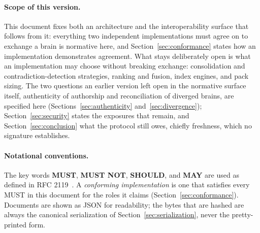 \documentclass[11pt,a4paper]{article}
\begin{document}
\paragraph{Scope of this version.}
This document fixes both an architecture and the interoperability surface that
follows from it: everything two independent implementations must agree on to
exchange a brain is normative here, and Section~\ref{sec:conformance} states
how an implementation demonstrates agreement. What stays deliberately open is what an implementation may choose
without breaking exchange: consolidation and contradiction-detection
strategies, ranking and fusion, index engines, and pack sizing. The two
questions an earlier version left open in the normative surface itself,
authenticity of authorship and reconciliation of diverged brains, are specified
here (Sections~\ref{sec:authenticity} and~\ref{sec:divergence});
Section~\ref{sec:security} states the exposures that remain, and
Section~\ref{sec:conclusion} what the protocol still owes, chiefly freshness,
which no signature establishes.

\paragraph{Notational conventions.}
The key words \textbf{MUST}, \textbf{MUST NOT}, \textbf{SHOULD}, and
\textbf{MAY} are used as defined in RFC 2119~\cite{rfc2119}. A
\emph{conforming implementation} is one that satisfies every MUST in this
document for the roles it claims (Section~\ref{sec:conformance}). Documents are
shown as JSON for readability; the bytes that are hashed are always the
canonical serialization of Section~\ref{sec:serialization}, never the
pretty-printed form.
\end{document}
